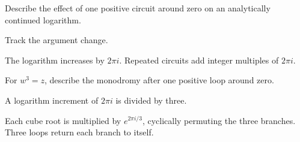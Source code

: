\begin{exercise}\label{exr:iv15-expand-15}
Describe the effect of one positive circuit around zero on an analytically continued logarithm.
\end{exercise}
\begin{hint}
Track the argument change.
\end{hint}
\begin{solution}
The logarithm increases by \(2\pi i\). Repeated circuits add integer multiples of \(2\pi i\).
\end{solution}

\begin{exercise}\label{exr:iv15-expand-16}
For \(w^3=z\), describe the monodromy after one positive loop around zero.
\end{exercise}
\begin{hint}
A logarithm increment of \(2\pi i\) is divided by three.
\end{hint}
\begin{solution}
Each cube root is multiplied by \(e^{2\pi i/3}\), cyclically permuting the three branches. Three loops return each branch to itself.
\end{solution}

